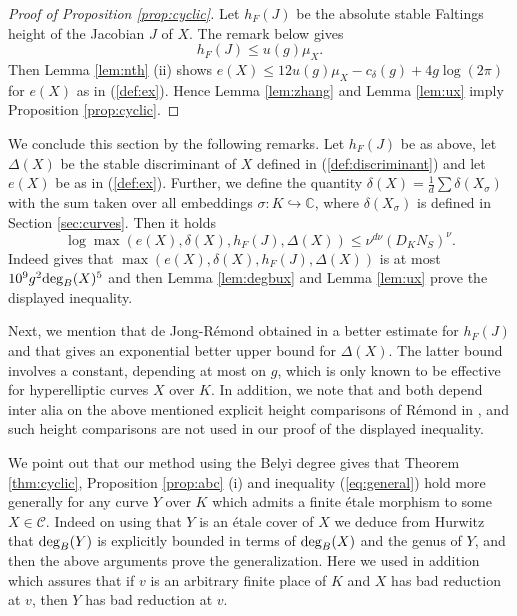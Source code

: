 \documentclass[11pt]{article}
\numberwithin{equation}{section}
\def\deg{\textnormal{deg}}
\newcommand {\CC}  {{\mathbb C}}
\begin{document}
\begin{proof}[Proof of Proposition \ref{prop:cyclic}]
Let $h_F(J)$ be the absolute stable Faltings height of the Jacobian $J$ of $X$. The remark below \cite[Proposition 4 (i)]{rvk:szpiro} gives 
\begin{equation}\label{eq:fhux}
h_F(J)\leq u(g)\mu_X.
\end{equation}
Then Lemma \ref{lem:nth} (ii) shows $e(X)\leq 12u(g)\mu_X-c_\delta(g)+4g\log(2\pi)$ for $e(X)$  as in (\ref{def:ex}). Hence  Lemma \ref{lem:zhang} and Lemma \ref{lem:ux} imply Proposition \ref{prop:cyclic}.
\end{proof}


We conclude this section by the following remarks. Let $h_F(J)$ be as above, let $\Delta(X)$ be the stable discriminant of $X$ defined in (\ref{def:discriminant}) and let $e(X)$ be as in (\ref{def:ex}). Further, we define the quantity $\delta(X)=\frac{1}{d}\sum\delta(X_\sigma)$ with the sum taken over all embeddings $\sigma:K\hookrightarrow \CC$, where  
 $\delta(X_\sigma)$ is defined in Section \ref{sec:curves}. Then it holds 
\begin{equation}\label{eq:general}
\log\max(e(X),\delta(X),h_F(J),\Delta(X))\leq \nu^{d\nu}(D_KN_S)^\nu.
\end{equation} 
Indeed \cite[Theorem 1.1.1]{javanpeykar:belyi} gives that $\max(e(X),\delta(X),h_F(J),\Delta(X))$ is at most $10^9g^2\deg_B(X)^5$ and then Lemma \ref{lem:degbux} and Lemma \ref{lem:ux} prove the displayed inequality. 


Next, we mention that de Jong-R\'emond  obtained in \cite[Theorem 1.2]{jore:shafarevich} a better estimate for $h_F(J)$ and that \cite[Theorem 3.2]{rvk:szpiro} gives an exponential better upper bound for $\Delta(X)$. The latter bound involves a constant, depending at most on $g$, which is only known to be effective for hyperelliptic curves $X$ over $K$. In addition, we note that \cite[Theorem 1.2]{jore:shafarevich} and \cite[Theorem 3.2]{rvk:szpiro}  both depend inter alia on the above mentioned explicit height comparisons of R\'emond in \cite{remond:rational}, and such height comparisons are not used in our proof of the displayed inequality.

We point out that our method using the Belyi degree gives that Theorem \ref{thm:cyclic}, Proposition \ref{prop:abc} (i) and inequality (\ref{eq:general}) hold more generally for any curve $Y$ over $K$ which admits a finite \'etale morphism to some $X\in \mathcal C$. Indeed on using that $Y$ is an \'etale cover of $X$ we deduce from Hurwitz that $\deg_B(Y)$ is explicitly bounded in terms of $\deg_B(X)$ and the genus of $Y$, and then the above arguments prove the generalization. Here we used in addition \cite[Corollary 4.10]{lilo:modelsofcurves} which assures that if $v$ is an arbitrary finite place of $K$ and $X$ has bad reduction at $v$, then $Y$ has bad reduction at $v$. 
\end{document}
